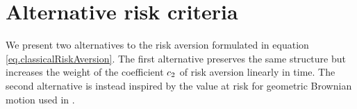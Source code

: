 \documentclass[10pt,a4paper]{article}
\begin{document}
%	
%	
% 	
%	
%	
%		
%	
%	

		
	
	

	
	\section{Alternative risk criteria}\label{sec.alternativeRiskCriteria}
	We present two alternatives to the risk aversion formulated  in equation \eqref{eq.classicalRiskAversion}. The first alternative preserves the same structure but increases the weight of the coefficient $c_{2}$ of risk aversion linearly in time.  The second alternative is instead inspired by the value at risk for geometric Brownian motion used in \cite{GS11opt}.
	
\end{document}
